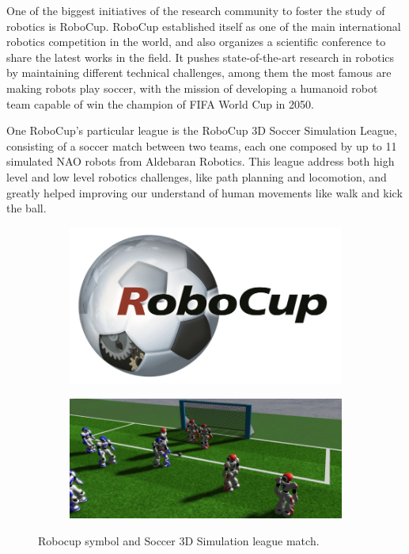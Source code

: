 
One of the biggest initiatives of the research community to foster the study of robotics is RoboCup. RoboCup established itself as one of the main international robotics competition in the world, and also organizes a scientific conference to share the latest works in the field. It pushes state-of-the-art research in robotics by maintaining different technical challenges, among them the most famous are making robots play soccer, with the mission of developing a humanoid robot team capable of win the champion of FIFA World Cup in 2050.

One RoboCup's particular league is the RoboCup 3D Soccer Simulation League, consisting of a soccer match between two teams, each one composed by up to 11 simulated NAO robots from Aldebaran Robotics. This league address both high level and low level robotics challenges, like path planning and locomotion, and greatly helped improving our understand of human movements like walk and kick the ball.

\begin{figure}[ht]
  	\centering
  	\begin{subfigure}[b]{0.45\textwidth}
              \centering
	 		\includegraphics[height=0.13\textheight]{Chapter1/RoboCup.png}	
     \end{subfigure}
     
	 \begin{subfigure}[b]{0.45\textwidth}
              \centering
	 		\includegraphics[height=0.13\textheight]{Chapter1/SS3D.png}
	 \end{subfigure}
	     
	 \caption{Robocup symbol and Soccer 3D Simulation league match.}
	\label{fig:robocup}
\end{figure}

